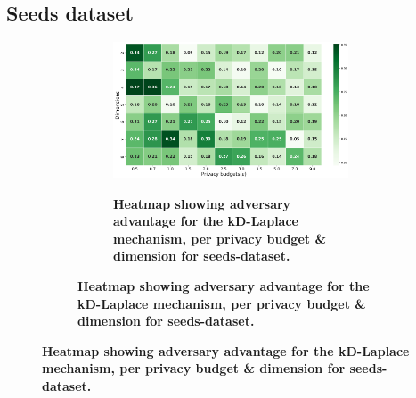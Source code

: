 \subsection{Seeds dataset}
\begin{figure}[H]
  \centering
  \begin{subfigure}[b]{0.9\textwidth}
    \begin{subfigure}[c]{1\textwidth}
      \caption{\textbf{Heatmap showing adversary advantage for the kD-Laplace mechanism, per privacy budget \& dimension for seeds-dataset.}}
      \includegraphics[width=1\textwidth]{Results/kd-laplace/kd-Laplace/seeds-dataset/shokri_mi_adv.png}
      \label{fig:privacy_seeds-dataset_adversial_advantage_kd-laplace}
    \end{subfigure}
    \vfill %


\end{subfigure}
\end{figure}
